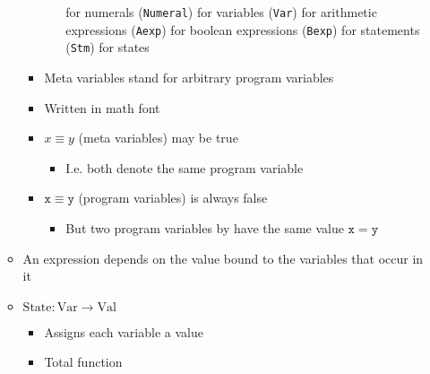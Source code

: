 \begin{itemize}
\begin{itemize}
\begin{itemize}
\begin{itemize}
                             for numerals (\verb+Numeral+)
                             for variables (\verb+Var+)
                             for arithmetic expressions (\verb+Aexp+)
                             for boolean expressions (\verb+Bexp+)
                             for statements (\verb+Stm+)
                            \ides{$\mathbf{\sigma}$:} for states
                        \end{itemize}
                    \item Meta variables stand for arbitrary program variables
                    \item Written in math font
                \end{itemize}
                \begin{itemize}
                    \item $x \equiv y$ (meta variables) may be true
                        \begin{itemize}
                            \item I.e. both denote the same program variable
                        \end{itemize}
                    \item $\mathtt{x} \equiv \mathtt{y}$ (program variables) is always false
                        \begin{itemize}
                            \item But two program variables by have the same value $\mathtt{x} = \mathtt{y}$
                        \end{itemize}
                \end{itemize}
        \end{itemize}
        \begin{itemize}
                \begin{itemize}
                    \item An expression depends on the value bound to the variables that occur in it
                    \item $\text{State}: \text{Var} \to \text{Val}$
                        \begin{itemize}
                            \item Assigns each variable a value
                            \item Total function

\end{itemize}
\end{itemize}
\end{itemize}
\end{itemize}
